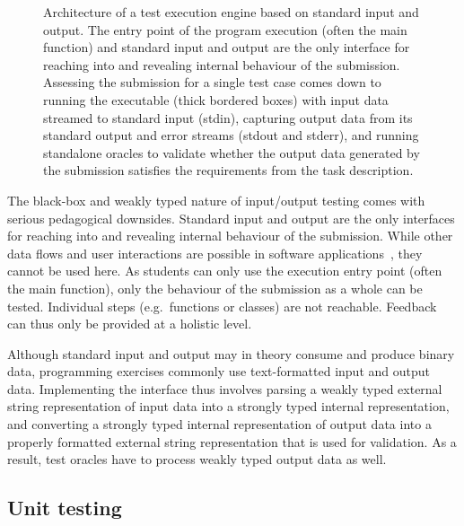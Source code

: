 \documentclass[../main]{subfiles}
\begin{document}
\begin{figure}
    \centering
    
    \caption{
        Architecture of a test execution engine based on standard input and output.
        The entry point of the program execution (often the main function) and standard input and output are the only interface for reaching into and revealing internal behaviour of the submission.
        Assessing the submission for a single test case comes down to running the executable (thick bordered boxes) with \textcolor{ugent-ps}{input data} streamed to standard input (stdin), capturing \textcolor{ugent-we}{output data} from its standard output and error streams (stdout and stderr), and running standalone oracles to validate whether the output data generated by the submission satisfies the requirements from the task description.
    }
    \label{fig:io-testing}
\end{figure}

The black-box and weakly typed nature of input/output testing comes with serious pedagogical downsides.
Standard input and output are the only interfaces for reaching into and revealing internal behaviour of the submission.
While other data flows and user interactions are possible in software applications~\autocite{khorramTestingFrameworkExecutable2022}, they cannot be used here.
As students can only use the execution entry point (often the main function), only the behaviour of the submission as a whole can be tested.
Individual steps (e.g.\ functions or classes) are not reachable.
Feedback can thus only be provided at a holistic level.

Although standard input and output may in theory consume and produce binary data, programming exercises commonly use text-formatted input and output data.
Implementing the interface thus involves parsing a weakly typed external string representation of input data into a strongly typed internal representation, and converting a strongly typed internal representation of output data into a properly formatted external string representation that is used for validation.
As a result, test oracles have to process weakly typed output data as well.

\subsection{Unit testing}\label{subsec:dsl-unit-testing}
\end{document}
